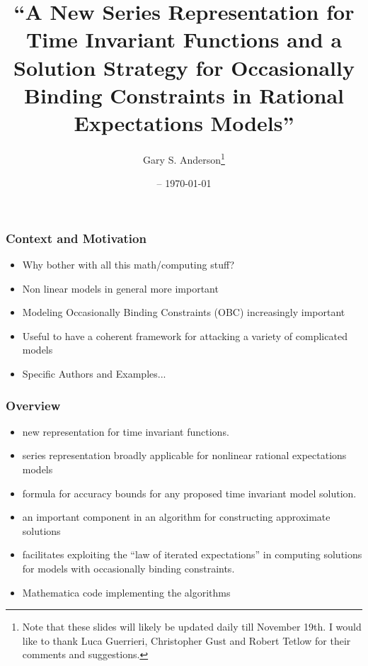 \documentclass[letter]{beamer}
\title{``A New Series Representation for Time Invariant Functions and
a Solution Strategy for Occasionally Binding Constraints in Rational Expectations Models''}
\date{\currenttime -- \today }
\author{Gary S. Anderson\thanks{Note that these slides will likely be updated daily till November 19th. I would like to thank Luca Guerrieri, Christopher Gust and Robert Tetlow for their comments and suggestions. }}
\begin{document}
\begin{frame}
  \titlepage
\end{frame}



\begin{frame}
  \frametitle{Context and Motivation}
  \begin{itemize}
  \item Why bother with all this math/computing stuff?
  \item Non linear models in general more important 
  \item Modeling Occasionally Binding Constraints (OBC) increasingly important
  \item Useful to have  a coherent framework for attacking a variety of complicated models 
  \item Specific Authors and Examples...

  \end{itemize}
\end{frame}



\begin{frame}
  \frametitle{Overview}
  \begin{itemize}
  \item  new representation for time invariant functions.
  \item  series representation broadly applicable for nonlinear rational expectations models 
\item  formula for accuracy bounds for any 
proposed time invariant model solution.
\item an important component in an algorithm for constructing approximate solutions 
\item facilitates exploiting the ``law of iterated expectations'' in computing solutions for models with occasionally binding constraints.
\item Mathematica code implementing the algorithms
  \end{itemize}
\end{frame}
\end{document}
